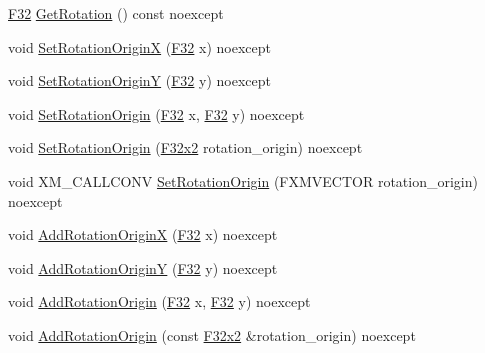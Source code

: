 \begin{DoxyCompactItemize}
\item 
\mbox{\hyperlink{namespacemage_aa97e833b45f06d60a0a9c4fc22ae02c0}{F32}} \mbox{\hyperlink{classmage_1_1_sprite_transform_ae7fc2e36ce99ea41a74d53032437dd58}{Get\+Rotation}} () const noexcept
\item 
void \mbox{\hyperlink{classmage_1_1_sprite_transform_a1928602ce38aa2ebf26becd93c875dc5}{Set\+Rotation\+OriginX}} (\mbox{\hyperlink{namespacemage_aa97e833b45f06d60a0a9c4fc22ae02c0}{F32}} x) noexcept
\item 
void \mbox{\hyperlink{classmage_1_1_sprite_transform_a8ccfaf7282419ed636cc97f911472604}{Set\+Rotation\+OriginY}} (\mbox{\hyperlink{namespacemage_aa97e833b45f06d60a0a9c4fc22ae02c0}{F32}} y) noexcept
\item 
void \mbox{\hyperlink{classmage_1_1_sprite_transform_adc5bb1cd5512bea503c981624088a5be}{Set\+Rotation\+Origin}} (\mbox{\hyperlink{namespacemage_aa97e833b45f06d60a0a9c4fc22ae02c0}{F32}} x, \mbox{\hyperlink{namespacemage_aa97e833b45f06d60a0a9c4fc22ae02c0}{F32}} y) noexcept
\item 
void \mbox{\hyperlink{classmage_1_1_sprite_transform_a2494e4350b47a6ef3e1f7642a8f7d8c6}{Set\+Rotation\+Origin}} (\mbox{\hyperlink{namespacemage_a9dc0d34d6ecc87e4cfa4a826102117bc}{F32x2}} rotation\+\_\+origin) noexcept
\item 
void X\+M\+\_\+\+C\+A\+L\+L\+C\+O\+NV \mbox{\hyperlink{classmage_1_1_sprite_transform_acbb3eebc3fd26d616f5e4ca75a8c112b}{Set\+Rotation\+Origin}} (F\+X\+M\+V\+E\+C\+T\+OR rotation\+\_\+origin) noexcept
\item 
void \mbox{\hyperlink{classmage_1_1_sprite_transform_a784e2f78ba65645ad2c40b4d249c744a}{Add\+Rotation\+OriginX}} (\mbox{\hyperlink{namespacemage_aa97e833b45f06d60a0a9c4fc22ae02c0}{F32}} x) noexcept
\item 
void \mbox{\hyperlink{classmage_1_1_sprite_transform_aa6fa39d59d2bd73d1b51ffbe185175a7}{Add\+Rotation\+OriginY}} (\mbox{\hyperlink{namespacemage_aa97e833b45f06d60a0a9c4fc22ae02c0}{F32}} y) noexcept
\item 
void \mbox{\hyperlink{classmage_1_1_sprite_transform_adc0912e49d43143f7fe5c8fc1c25dacf}{Add\+Rotation\+Origin}} (\mbox{\hyperlink{namespacemage_aa97e833b45f06d60a0a9c4fc22ae02c0}{F32}} x, \mbox{\hyperlink{namespacemage_aa97e833b45f06d60a0a9c4fc22ae02c0}{F32}} y) noexcept
\item 
void \mbox{\hyperlink{classmage_1_1_sprite_transform_a59d9f7b6e6a31110d4657fbc00961182}{Add\+Rotation\+Origin}} (const \mbox{\hyperlink{namespacemage_a9dc0d34d6ecc87e4cfa4a826102117bc}{F32x2}} \&rotation\+\_\+origin) noexcept

\end{DoxyCompactItemize}
